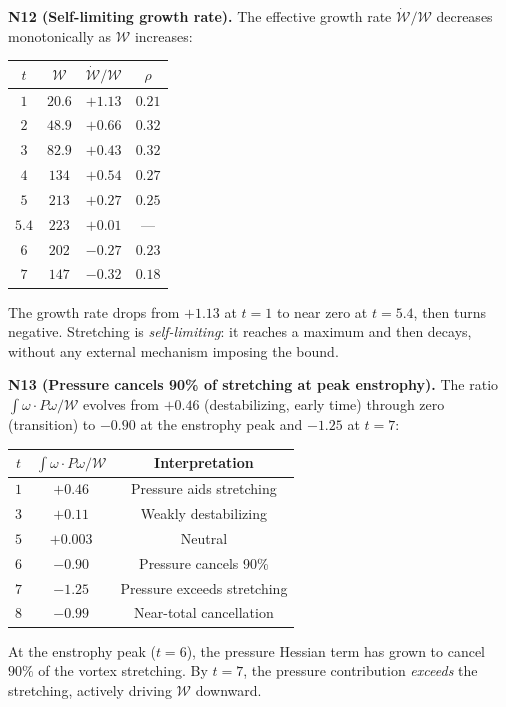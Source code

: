\documentclass[11pt,a4paper]{article}
\theoremstyle{plain}
\theoremstyle{definition}
\theoremstyle{remark}
\begin{document}
\textbf{N12 (Self-limiting growth rate).}
The effective growth rate $\dot{\mathcal{W}}/\mathcal{W}$
decreases monotonically as $\mathcal{W}$ increases:
\begin{center}
\renewcommand{\arraystretch}{1.2}
\begin{tabular}{@{}cccc@{}}
\toprule
$t$ & $\mathcal{W}$ & $\dot{\mathcal{W}}/\mathcal{W}$
  & $\rho$ \\
\midrule
$1$ & $20.6$ & $+1.13$ & $0.21$ \\
$2$ & $48.9$ & $+0.66$ & $0.32$ \\
$3$ & $82.9$ & $+0.43$ & $0.32$ \\
$4$ & $134$ & $+0.54$ & $0.27$ \\
$5$ & $213$ & $+0.27$ & $0.25$ \\
$5.4$ & $223$ & $+0.01$ & --- \\
$6$ & $202$ & $-0.27$ & $0.23$ \\
$7$ & $147$ & $-0.32$ & $0.18$ \\
\bottomrule
\end{tabular}
\end{center}
The growth rate drops from $+1.13$ at $t=1$ to
near zero at $t=5.4$, then turns negative.
Stretching is \emph{self-limiting}: it reaches a
maximum and then decays, without any external
mechanism imposing the bound.

\textbf{N13 (Pressure cancels 90\% of stretching
at peak enstrophy).}
The ratio
$\int\omega\cdot P\omega/\mathcal{W}$ evolves from
$+0.46$ (destabilizing, early time) through zero
(transition) to $-0.90$ at the enstrophy peak and
$-1.25$ at $t=7$:
\begin{center}
\renewcommand{\arraystretch}{1.2}
\begin{tabular}{@{}ccc@{}}
\toprule
$t$ & $\int\omega\cdot P\omega/\mathcal{W}$
  & Interpretation \\
\midrule
$1$ & $+0.46$ & Pressure aids stretching \\
$3$ & $+0.11$ & Weakly destabilizing \\
$5$ & $+0.003$ & Neutral \\
$6$ & $\mathbf{-0.90}$ & Pressure cancels 90\% \\
$7$ & $\mathbf{-1.25}$ & Pressure exceeds stretching \\
$8$ & $-0.99$ & Near-total cancellation \\
\bottomrule
\end{tabular}
\end{center}
At the enstrophy peak ($t=6$), the pressure
Hessian term has grown to cancel $90\%$ of the
vortex stretching.  By $t=7$, the pressure
contribution \emph{exceeds} the stretching,
actively driving $\mathcal{W}$ downward.
\end{document}
